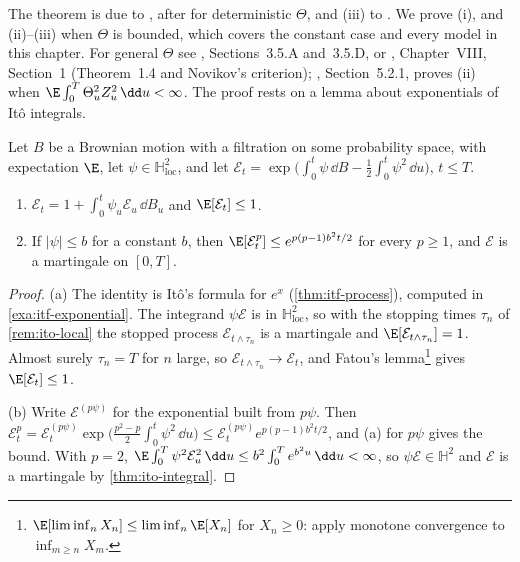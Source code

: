The theorem is due to \textcite{girsanov-transforming}, after \textcite{cameron-martin-1944}
for deterministic $\Theta$, and (iii) to \textcite{novikov-identity}. We prove (i), and (ii)--(iii) when $\Theta$ is bounded, which
covers the constant case and every model in this chapter. For general $\Theta$ see
\textcite{karatzas-shreve}, Sections~3.5.A and~3.5.D, or \textcite{revuz-yor},
Chapter~VIII, Section~1 (Theorem~1.4 and Novikov's criterion); \textcite{shreve2},
Section~5.2.1, proves (ii) when $\E\int_0^T\Theta_u^2Z_u^2\,\dd u<\infty$. The proof rests
on a lemma about exponentials of It\^o integrals.

\begin{lemma}\label{lem:rn-exponential}
Let $B$ be a Brownian motion with a filtration on some probability space, with expectation
$\E$, let $\psi\in\mathbb H^2_{\mathrm{loc}}$, and let
$\mathcal E_t=\exp\big(\int_0^t\psi\,\dd B-\frac12\int_0^t\psi^2\,\dd u\big)$, $t\le T$.
\begin{enumerate}[label=(\alph*)]
  \item $\mathcal E_t=1+\int_0^t\psi_u\mathcal E_u\,\dd B_u$ and $\E[\mathcal E_t]\le1$.
  \item If $|\psi|\le b$ for a constant $b$, then $\E[\mathcal E_t^p]\le e^{p(p-1)b^2t/2}$
    for every $p\ge1$, and $\mathcal E$ is a martingale on $[0,T]$.
\end{enumerate}
\end{lemma}

\begin{proof}
(a) The identity is It\^o's formula for $e^x$ (\cref{thm:itf-process}), computed in
\cref{exa:itf-exponential}. The integrand $\psi\mathcal E$ is in $\mathbb
H^2_{\mathrm{loc}}$, so with the stopping times $\tau_n$ of \cref{rem:ito-local} the stopped
process $\mathcal E_{t\wedge\tau_n}$ is a martingale and $\E[\mathcal E_{t\wedge\tau_n}]=1$.
Almost surely $\tau_n=T$ for $n$ large, so $\mathcal E_{t\wedge\tau_n}\to\mathcal E_t$, and
Fatou's lemma\footnote{$\E[\liminf_nX_n]\le\liminf_n\E[X_n]$ for $X_n\ge0$: apply monotone
convergence to $\inf_{m\ge n}X_m$.} gives $\E[\mathcal E_t]\le1$.

(b) Write $\mathcal E^{(p\psi)}$ for the exponential built from $p\psi$. Then
$\mathcal E_t^p=\mathcal E^{(p\psi)}_t\exp\big(\frac{p^2-p}2\int_0^t\psi^2\,\dd u\big)\le
\mathcal E^{(p\psi)}_te^{p(p-1)b^2t/2}$, and (a) for $p\psi$ gives the bound. With $p=2$,
$\E\int_0^T\psi^2\mathcal E_u^2\,\dd u\le b^2\int_0^Te^{b^2u}\,\dd u<\infty$, so
$\psi\mathcal E\in\mathbb H^2$ and $\mathcal E$ is a martingale by \cref{thm:ito-integral}.
\end{proof}


